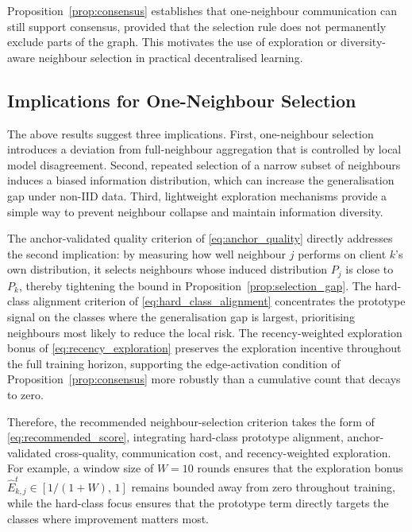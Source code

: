 \documentclass[conference]{IEEEtran}
\begin{document}
Proposition~\ref{prop:consensus} establishes that one-neighbour communication can still support consensus, provided that the selection rule does not permanently exclude parts of the graph. This motivates the use of exploration or diversity-aware neighbour selection in practical decentralised learning.

\subsection{Implications for One-Neighbour Selection}
\label{subsec:implications-for-one-neighbour-selection}

The above results suggest three implications. First, one-neighbour selection introduces a deviation from full-neighbour aggregation that is controlled by local model disagreement. Second, repeated selection of a narrow subset of neighbours induces a biased information distribution, which can increase the generalisation gap under non-IID data. Third, lightweight exploration mechanisms provide a simple way to prevent neighbour collapse and maintain information diversity.

The anchor-validated quality criterion of \eqref{eq:anchor_quality} directly addresses the second implication: by measuring how well neighbour \(j\) performs on client \(k\)'s own distribution, it selects neighbours whose induced distribution \(P_j\) is close to \(P_k\), thereby tightening the bound in Proposition~\ref{prop:selection_gap}. The hard-class alignment criterion of \eqref{eq:hard_class_alignment} concentrates the prototype signal on the classes where the generalisation gap is largest, prioritising neighbours most likely to reduce the local risk. The recency-weighted exploration bonus of \eqref{eq:recency_exploration} preserves the exploration incentive throughout the full training horizon, supporting the edge-activation condition of Proposition~\ref{prop:consensus} more robustly than a cumulative count that decays to zero.

Therefore, the recommended neighbour-selection criterion takes the form of \eqref{eq:recommended_score}, integrating hard-class prototype alignment, anchor-validated cross-quality, communication cost, and recency-weighted exploration. For example, a window size of $W = 10$ rounds ensures that the exploration bonus \(\hat{E}_{k,j}^t \in [1/(1+W),\, 1]\) remains bounded away from zero throughout training, while the hard-class focus ensures that the prototype term directly targets the classes where improvement matters most.
\end{document}
